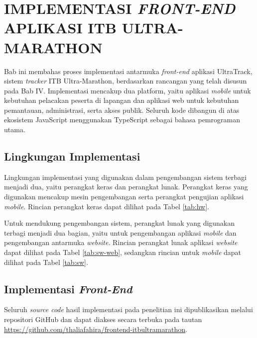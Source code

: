 \cleardoublepage
\chapter{IMPLEMENTASI \textit{FRONT-END} APLIKASI ITB ULTRA-MARATHON}
\label{chap:implementasi}

Bab ini membahas proses implementasi antarmuka \textit{front-end} aplikasi UltraTrack, sistem \textit{tracker} ITB Ultra-Marathon, berdasarkan rancangan yang telah disusun pada Bab IV. Implementasi mencakup dua platform, yaitu aplikasi \textit{mobile} untuk kebutuhan pelacakan peserta di lapangan dan aplikasi web untuk kebutuhan pemantauan, administrasi, serta akses publik. Seluruh kode dibangun di atas ekosistem JavaScript menggunakan TypeScript sebagai bahasa pemrograman utama.

\section{Lingkungan Implementasi}

Lingkungan implementasi yang digunakan dalam pengembangan sistem terbagi menjadi dua, yaitu perangkat keras dan perangkat lunak. Perangkat keras yang digunakan mencakup mesin pengembangan serta perangkat pengujian aplikasi \textit{mobile}. Rincian perangkat keras dapat dilihat pada Tabel \ref{tab:hw}.



Untuk mendukung pengembangan sistem, perangkat lunak yang digunakan terbagi menjadi dua bagian, yaitu untuk pengembangan aplikasi \textit{mobile} dan pengembangan antarmuka \textit{website}. Rincian perangkat lunak aplikasi \textit{website} dapat dilihat pada Tabel \ref{tab:sw-web}, sedangkan rincian untuk \textit{mobile} dapat dilihat pada Tabel \ref{tab:sw}.




\section{Implementasi \textit{Front-End}}
\label{sec:impl-frontend}

Seluruh \textit{source code} hasil implementasi pada penelitian ini dipublikasikan melalui repositori GitHub dan dapat diakses secara terbuka pada tautan \url{https://github.com/thaliafahira/frontend-itbultramarathon}.

